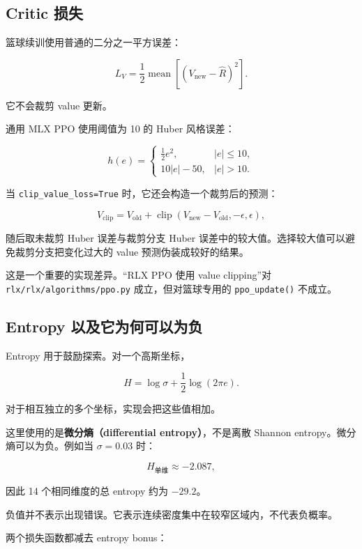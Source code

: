 \documentclass[
  chinese,
  11pt,
  letterpaper,
]{article}
\begin{document}
\subsection{Critic 损失}\label{critic-ux635fux5931}

篮球续训使用普通的二分之一平方误差：

\[
L_V
=
\frac12\operatorname{mean}\left[
(V_{\mathrm{new}}-\widehat R)^2
\right].
\]

它不会裁剪 value 更新。

通用 MLX PPO 使用阈值为 10 的 Huber 风格误差：

\[
h(e)=
\begin{cases}
\frac12e^2,&|e|\le10,\\
10|e|-50,&|e|>10.
\end{cases}
\]

当 \texttt{clip\_value\_loss=True} 时，它还会构造一个裁剪后的预测：

\[
V_{\mathrm{clip}}
=
V_{\mathrm{old}}+
\operatorname{clip}(V_{\mathrm{new}}-V_{\mathrm{old}},-\epsilon,\epsilon),
\]

随后取未裁剪 Huber 误差与裁剪分支 Huber
误差中的较大值。选择较大值可以避免裁剪分支把变化过大的 value
预测伪装成较好的结果。

这是一个重要的实现差异。``RLX PPO 使用 value clipping''对
\texttt{rlx/\allowbreak{}rlx/\allowbreak{}algorith\allowbreak{}ms/\allowbreak{}ppo.py}
成立，但对篮球专用的 \texttt{ppo\_update()} 不成立。

\subsection{Entropy
以及它为何可以为负}\label{entropy-ux4ee5ux53caux5b83ux4e3aux4f55ux53efux4ee5ux4e3aux8d1f}

Entropy 用于鼓励探索。对一个高斯坐标，

\[
H
=
\log\sigma+\frac12\log(2\pi e).
\]

对于相互独立的多个坐标，实现会把这些值相加。

这里使用的是\textbf{微分熵（differential entropy）}，不是离散 Shannon
entropy。微分熵可以为负。例如当 \(\sigma=0.03\) 时：

\[
H_{\text{单维}}\approx-2.087,
\]

因此 14 个相同维度的总 entropy 约为 \(-29.2\)。

负值并不表示出现错误。它表示连续密度集中在较窄区域内，不代表负概率。

两个损失函数都减去 entropy bonus：
\end{document}
